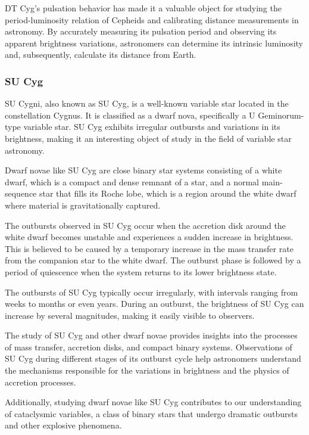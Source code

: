 DT Cyg's pulsation behavior has made it a valuable object for studying the period-luminosity relation of Cepheids and calibrating distance measurements in astronomy. By accurately measuring its pulsation period and observing its apparent brightness variations, astronomers can determine its intrinsic luminosity and, subsequently, calculate its distance from Earth.



\subsubsection*{ SU Cyg }
SU Cygni, also known as SU Cyg, is a well-known variable star located in the constellation Cygnus. It is classified as a dwarf nova, specifically a U Geminorum-type variable star. SU Cyg exhibits irregular outbursts and variations in its brightness, making it an interesting object of study in the field of variable star astronomy.

Dwarf novae like SU Cyg are close binary star systems consisting of a white dwarf, which is a compact and dense remnant of a star, and a normal main-sequence star that fills its Roche lobe, which is a region around the white dwarf where material is gravitationally captured.

The outbursts observed in SU Cyg occur when the accretion disk around the white dwarf becomes unstable and experiences a sudden increase in brightness. This is believed to be caused by a temporary increase in the mass transfer rate from the companion star to the white dwarf. The outburst phase is followed by a period of quiescence when the system returns to its lower brightness state.

The outbursts of SU Cyg typically occur irregularly, with intervals ranging from weeks to months or even years. During an outburst, the brightness of SU Cyg can increase by several magnitudes, making it easily visible to observers.

The study of SU Cyg and other dwarf novae provides insights into the processes of mass transfer, accretion disks, and compact binary systems. Observations of SU Cyg during different stages of its outburst cycle help astronomers understand the mechanisms responsible for the variations in brightness and the physics of accretion processes.

Additionally, studying dwarf novae like SU Cyg contributes to our understanding of cataclysmic variables, a class of binary stars that undergo dramatic outbursts and other explosive phenomena.

